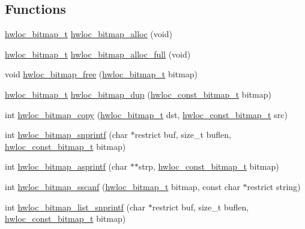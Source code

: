 \subsection*{Functions}
\begin{DoxyCompactItemize}
\item 
\hyperlink{a00205_gaa3c2bf4c776d603dcebbb61b0c923d84}{hwloc\+\_\+bitmap\+\_\+t} \hyperlink{a00205_gadece3d1eb5199fc2fb99bc7dcf1ccc05}{hwloc\+\_\+bitmap\+\_\+alloc} (void)
\item 
\hyperlink{a00205_gaa3c2bf4c776d603dcebbb61b0c923d84}{hwloc\+\_\+bitmap\+\_\+t} \hyperlink{a00205_ga02853b4a224970587b9d7a0e20d857c0}{hwloc\+\_\+bitmap\+\_\+alloc\+\_\+full} (void)
\item 
void \hyperlink{a00205_ga156130d85b3a0674d6e0e6770fe68fbe}{hwloc\+\_\+bitmap\+\_\+free} (\hyperlink{a00205_gaa3c2bf4c776d603dcebbb61b0c923d84}{hwloc\+\_\+bitmap\+\_\+t} bitmap)
\item 
\hyperlink{a00205_gaa3c2bf4c776d603dcebbb61b0c923d84}{hwloc\+\_\+bitmap\+\_\+t} \hyperlink{a00205_gae679434c1a5f41d3560a8a7e2c1b0dee}{hwloc\+\_\+bitmap\+\_\+dup} (\hyperlink{a00205_gae991a108af01d408be2776c5b2c467b2}{hwloc\+\_\+const\+\_\+bitmap\+\_\+t} bitmap)
\item 
int \hyperlink{a00205_ga72a29824798b48784b8217471ec8f14c}{hwloc\+\_\+bitmap\+\_\+copy} (\hyperlink{a00205_gaa3c2bf4c776d603dcebbb61b0c923d84}{hwloc\+\_\+bitmap\+\_\+t} dst, \hyperlink{a00205_gae991a108af01d408be2776c5b2c467b2}{hwloc\+\_\+const\+\_\+bitmap\+\_\+t} src)
\item 
int \hyperlink{a00205_ga9511644657030a021dce9941e3cda583}{hwloc\+\_\+bitmap\+\_\+snprintf} (char $\ast$restrict buf, size\+\_\+t buflen, \hyperlink{a00205_gae991a108af01d408be2776c5b2c467b2}{hwloc\+\_\+const\+\_\+bitmap\+\_\+t} bitmap)
\item 
int \hyperlink{a00205_ga0fece972134fdecf2da9bc7a11dd827e}{hwloc\+\_\+bitmap\+\_\+asprintf} (char $\ast$$\ast$strp, \hyperlink{a00205_gae991a108af01d408be2776c5b2c467b2}{hwloc\+\_\+const\+\_\+bitmap\+\_\+t} bitmap)
\item 
int \hyperlink{a00205_ga064a85c643a364b60acbfa0f3663fc18}{hwloc\+\_\+bitmap\+\_\+sscanf} (\hyperlink{a00205_gaa3c2bf4c776d603dcebbb61b0c923d84}{hwloc\+\_\+bitmap\+\_\+t} bitmap, const char $\ast$restrict string)
\item 
int \hyperlink{a00205_ga3d06e6447edeb61e56a9ad83f31f0a37}{hwloc\+\_\+bitmap\+\_\+list\+\_\+snprintf} (char $\ast$restrict buf, size\+\_\+t buflen, \hyperlink{a00205_gae991a108af01d408be2776c5b2c467b2}{hwloc\+\_\+const\+\_\+bitmap\+\_\+t} bitmap)
$$
\end{DoxyCompactItemize}
